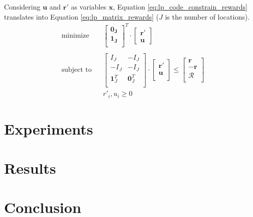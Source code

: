 \documentclass[12pt]{article}
\newcommand{\vect}[1]{\mathbf{#1}}  %
\begin{document}
    Considering $\vect{u}$ and $\vect{r'}$ as variables $\vect{x}$, Equation \ref{eq:lp_code_constrain_rewards} translates into Equation \ref{eq:lp_matrix_rewards} ($J$ is the number of locations).
    \begin{equation} \label{eq:lp_matrix_rewards}
    \begin{aligned}
        & \text{minimize}
        & & \begin{bmatrix}
                \vect{0_J}\\
                \vect{1_J}\\
            \end{bmatrix}^T \cdot
            \begin{bmatrix}
                \vect{r'}\\
                \vect{u}
            \end{bmatrix}\\ \\
        & \text{subject to}
        & & \begin{bmatrix}
                I_J & -I_J\\
                -I_J & -I_J\\
                \vect{1}^T_J & \vect{0}^T_J\\
            \end{bmatrix} \cdot
            \begin{bmatrix}
                \vect{r'}\\
                \vect{u}\\
            \end{bmatrix} \leq
            \begin{bmatrix}
                \vect{r}\\
                -\vect{r}\\
                \mathcal{R}\\
            \end{bmatrix}\\
        &&& r'_i, u_i \geq 0
    \end{aligned}
    \end{equation}
    
    \section{Experiments} \label{sec:Experiments}
    
    \section{Results} \label{sec:Results}
    \section{Conclusion} \label{sec:Conclusion}
    
    \blindtext
    
    
\end{document}
